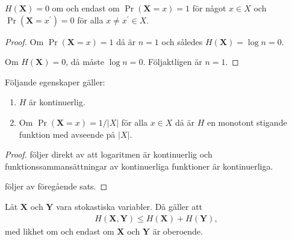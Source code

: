 \documentclass{beamer}
\let\stoch\mathbf{}
\begin{document}
\begin{frame}
  \begin{corollary}
    \(H(\stoch X) = 0\) om och endast om \(\Pr(\stoch X = x) = 1\) för något 
    \(x\in X\) och \(\Pr(\stoch X = x^\prime) = 0\) för alla \(x\neq x^\prime 
    \in X\).
  \end{corollary}

  \begin{proof}
    Om \(\Pr(\stoch X = x) = 1\) då är \(n = 1\) och således \(H(\stoch X) 
    = \log n = 0\).

    Om \(H(\stoch X) = 0\), då måste \(\log n = 0\).
    Följaktligen är \(n = 1\).
  \end{proof}
\end{frame}

\begin{frame}
  \begin{theorem}
    Följande egenskaper gäller:
    \begin{enumerate}
      \item\label{prop:cont} \(H\) är kontinuerlig.
      \item\label{prop:mono} Om \(\Pr(\stoch X = x) = 1/|X|\) för alla \(x\in 
        X\) då är \(H\) en monotont stigande funktion med avseende på \(|X|\).
    \end{enumerate}
  \end{theorem}

  \begin{proof}
     följer direkt av att logaritmen är kontinuerlig och 
    funktionssammansättningar av kontinuerliga funktioner är kontinuerliga.

     följer av föregående sats.
  \end{proof}
\end{frame}

\begin{frame}
  \begin{lemma}
    Låt \(\stoch X\) och \(\stoch Y\) vara stokastiska variabler.
    Då gäller att
    \begin{align*}
      H(\stoch X, \stoch Y)\leq H(\stoch X) + H(\stoch Y),
    \end{align*}
    med likhet om och endast om \(\stoch X\) och \(\stoch Y\) är oberoende.
  \end{lemma}
\end{frame}

%
%
\end{document}
